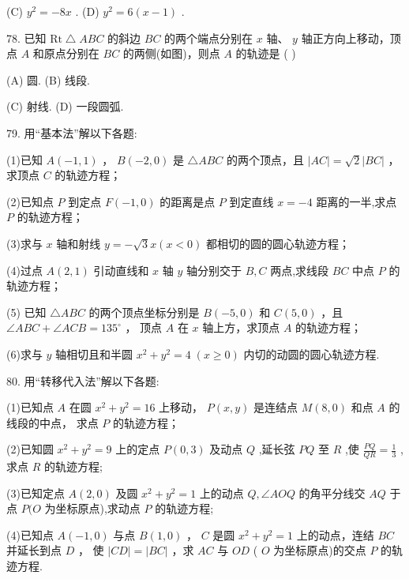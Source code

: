 \documentclass[10pt]{article}
\begin{document}
(C) \({y}^{2} =  - {8x}\) . (D) \({y}^{2} = 6\left( {x - 1}\right)\) .

78. 已知 \(\mathrm{{Rt}}\bigtriangleup {ABC}\) 的斜边 \({BC}\) 的两个端点分别在 \(x\) 轴、 \(y\) 轴正方向上移动，顶点 \(A\) 和原点分别在 \({BC}\) 的两侧(如图)，则点 \(A\) 的轨迹是 ( )

(A) 圆. (B) 线段.

(C) 射线. (D) 一段圆弧.

79. 用“基本法”解以下各题:

(1)已知 \(A\left( {-1,1}\right)\) ， \(B\left( {-2,0}\right)\) 是 \(\bigtriangleup  {ABC}\) 的两个顶点，且 \(\left| {AC}\right|  = \sqrt{2}\left| {BC}\right|\) ，求顶点 \(C\) 的轨迹方程；

(2)已知点 \(P\) 到定点 \(F\left( {-1,0}\right)\) 的距离是点 \(P\) 到定直线 \(x =  - 4\) 距离的一半,求点 \(P\) 的轨迹方程；

(3)求与 \(x\) 轴和射线 \(y =  - \sqrt{3}x\left( {x < 0}\right)\) 都相切的圆的圆心轨迹方程；

(4)过点 \(A\left( {2,1}\right)\) 引动直线和 \(x\) 轴 \(y\) 轴分别交于 \(B,C\) 两点,求线段 \({BC}\) 中点 \(P\) 的轨迹方程；

(5) 已知 \(\bigtriangleup  {ABC}\) 的两个顶点坐标分别是 \(B\left( {-5,0}\right)\) 和 \(C\left( {5,0}\right)\) ，且 \(\angle {ABC} + \angle {ACB} = {135}^{ \circ  }\) ， 顶点 \(A\) 在 \(x\) 轴上方，求顶点 \(A\) 的轨迹方程；

(6)求与 \(y\) 轴相切且和半圆 \({x}^{2} + {y}^{2} = 4\;\left( {x \geq  0}\right)\) 内切的动圆的圆心轨迹方程.

80. 用“转移代入法”解以下各题:

(1)已知点 \(A\) 在圆 \({x}^{2} + {y}^{2} = {16}\) 上移动， \(P\left( {x,y}\right)\) 是连结点 \(M\left( {8,0}\right)\) 和点 \(A\) 的线段的中点， 求点 \(P\) 的轨迹方程；

(2)已知圆 \({x}^{2} + {y}^{2} = 9\) 上的定点 \(P\left( {0,3}\right)\) 及动点 \(Q\) ,延长弦 \({PQ}\) 至 \(R\) ,使 \(\frac{PQ}{QR} = \frac{1}{3}\) ,求点 \(R\) 的轨迹方程;

(3)已知定点 \(A\left( {2,0}\right)\) 及圆 \({x}^{2} + {y}^{2} = 1\) 上的动点 \(Q,\angle {AOQ}\) 的角平分线交 \({AQ}\) 于点 \(P(O\) 为坐标原点),求动点 \(P\) 的轨迹方程;

(4)已知点 \(A\left( {-1,0}\right)\) 与点 \(B\left( {1,0}\right)\) ， \(C\) 是圆 \({x}^{2} + {y}^{2} = 1\) 上的动点，连结 \({BC}\) 并延长到点 \(D\) ， 使 \(\left| {CD}\right|  = \left| {BC}\right|\) ，求 \({AC}\) 与 \({OD}\) ( \(O\) 为坐标原点)的交点 \(P\) 的轨迹方程.
\end{document}
